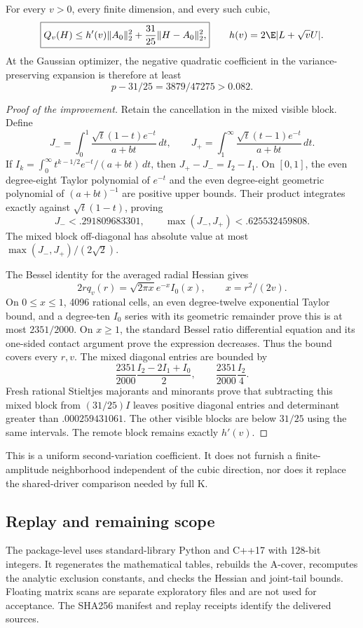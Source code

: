 \begin{theorem}
For every $v>0$, every finite dimension, and every such cubic,
\[
 \boxed{Q_v(H)\le h'(v)\|A_0\|_2^2+\frac{31}{25}\|H-A_0\|_2^2,}
 \qquad h(v)=2\E|L+\sqrt v U|.
\]
At the Gaussian optimizer, the negative quadratic coefficient in the
variance-preserving expansion is therefore at least
\[
 p-31/25=3879/47275>0.082.
\]
\end{theorem}
\begin{proof}[Proof of the improvement]
Retain the cancellation in the mixed visible block. Define
\[
 J_- =\int_0^1\frac{\sqrt t(1-t)e^{-t}}{a+bt}\,dt,
 \qquad J_+ =\int_1^\infty\frac{\sqrt t(t-1)e^{-t}}{a+bt}\,dt.
\]
If $I_k=\int_0^\infty t^{k-1/2}e^{-t}/(a+bt)\,dt$, then
$J_+-J_-=I_2-I_1$. On $[0,1]$, the even degree-eight Taylor polynomial
of $e^{-t}$ and the even degree-eight geometric polynomial of
$(a+bt)^{-1}$ are positive upper bounds. Their product integrates exactly
against $\sqrt t(1-t)$, proving
\[
 J_-<.291809683301,\qquad\max(J_-,J_+)<.625532459808.
\]
The mixed block off-diagonal has absolute value at most
$\max(J_-,J_+)/(2\sqrt2)$.

The Bessel identity for the averaged radial Hessian gives
\[
 2rq_v(r)=\sqrt{2\pi x}e^{-x}I_0(x),\qquad x=r^2/(2v).
\]
On $0\le x\le1$, 4096 rational cells, an even degree-twelve exponential
Taylor bound, and a degree-ten $I_0$ series with its geometric remainder
prove this is at most $2351/2000$. On $x\ge1$, the standard Bessel
ratio differential equation and its one-sided contact argument prove
the expression decreases. Thus the bound covers every $r,v$.
The mixed diagonal entries are bounded by
\[
 \frac{2351}{2000}\frac{I_2-2I_1+I_0}{2},\qquad
 \frac{2351}{2000}\frac{I_2}{4}.
\]
Fresh rational Stieltjes majorants and minorants prove that subtracting
this mixed block from $(31/25)I$ leaves positive diagonal entries and
determinant greater than $.000259431061$. The other visible blocks
are below $31/25$ using the same intervals. The remote block remains
exactly $h'(v)$.
\end{proof}

This is a uniform second-variation coefficient. It does not furnish a
finite-amplitude neighborhood independent of the cubic direction, nor
does it replace the shared-driver comparison needed by full K.

\subsection{Replay and remaining scope}
The package-level  uses standard-library Python and
C++17 with 128-bit integers. It regenerates the mathematical tables,
rebuilds the A-cover, recomputes the analytic exclusion constants, and
checks the Hessian and joint-tail bounds. Floating matrix scans are
separate exploratory files and are not used for acceptance. The
SHA256 manifest and replay receipts identify the delivered sources.

